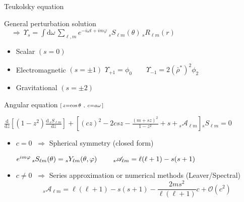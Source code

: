 \documentclass[9pt]{beamer}
\newcommand{\dd}{\mathrm{d}}
\begin{document}
\begin{frame}{Teukolsky equation}
	\begin{block}{General perturbation solution $\displaystyle 
			\quad\Rightarrow~ \Upsilon_s = \int\dd\omega \,\sum_{\ell,m} e^{-i\omega t + i m \varphi} \, {}_{s}S_{\ell m}(\theta)\, {}_{s}R_{\ell m}(r)$}
		\begin{itemize}
			\item Scalar $(s=0)$
			\item Electromagnetic $(s=\pm1)$ \hspace*{1cm}$\boxed{\Upsilon_{+1} = \phi_0 \qquad \Upsilon_{-1} = 2 (\bar{\rho}^*)^2 \phi_2 }$
			\item Gravitational $(s=\pm 2)$
		\end{itemize}
	\end{block}

	\begin{block}{Angular equation $\hfill\scriptstyle [\, z = \cos\theta ~,~ c = a \omega \,]$}
		\begin{center}
			$\displaystyle \frac{\dd}{\dd z} \left[ (1-z^2) \frac{\dd\, {}_{s}S_{\ell m}}{\dd z} \right] + \left[ (c z)^2 - 2 c s z  -\frac{(m + s z)^2}{1 - z^2} + s + {}_{s}\mathscr{A}_{\ell m} \right] {}_{s}S_{\ell m} = 0 $
		\end{center}
		\begin{itemize}
			\setlength\itemsep{1em}
			\item $c=0$ $~\Rightarrow$ Spherical symmetry (closed form) 
			\begin{center}
				$ e^{i m \varphi} \,{}_{s}S_{\ell m}(\theta) = {}_{s}Y_{\ell m}(\theta,\varphi)
				\hspace*{0.8cm}{}_{s}\mathscr{A}_{\ell m} = \ell(\ell+1)-s(s+1)$
			\end{center}
			\item $c\ne0$ $~\Rightarrow$ Series approximation or numerical methods (Leaver/Spectral)
			$${}_{s}\mathscr{A}_{\ell m} = \ell(\ell+1) -s(s+1) - \frac{2 m s^2}{\ell(\ell+1)} c + \mathcal{O}(c^2)$$
		\end{itemize}
	\end{block}

\end{frame}
\end{document}
